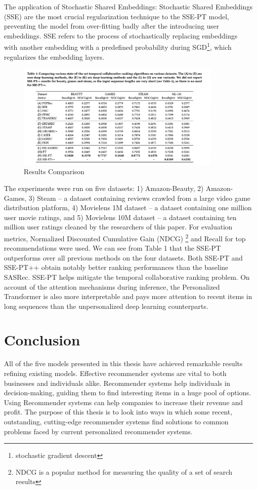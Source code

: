 The application of Stochastic Shared Embeddings: Stochastic Shared Embeddings (SSE) are the most crucial regularization technique to the SSE-PT model, preventing the model from over-fitting badly after the introducing user embeddings. SSE refers to the process of 
stochastically replacing embeddings with another embedding with
a predefined probability during SGD\footnote{stochastic gradient descent}, which regularizes the embedding layers. 
\begin{figure}[ht!]
    \centering
    \includegraphics[width=100mm]{results_Transformer.png}
    \caption{Results Comparison
    \label{overflow}}
\end{figure}
The experiments were run on five datasets: 1) Amazon-Beauty, 2) Amazon-Games, 3) Steam -- a dataset containing reviews crawled from a large video game distribution platform, 4) Movielens 1M dataset -- a dataset containing one million user movie ratings, and 5) Movielens 10M dataset -- a dataset containing ten million user ratings cleaned by the researchers of this paper. For evaluation metrics, Normalized Discounted Cumulative Gain (NDCG) \footnote{NDCG is a popular method for measuring the quality of a set of search results} and Recall for top recommendations were used. We can see from Table 1 that the SSE-PT outperforms over all previous methods on the four datasets. Both SSE-PT and SSE-PT++ obtain notably better ranking performances than the baseline SASRec. SSE-PT helps mitigate the temporal collaborative ranking problem. On account of the attention mechanisms
during inference, the Personalized Transformer is also more interpretable and pays more attention to recent items in long sequences than the unpersonalized deep learning counterparts.

\chapter{ Conclusion}

All of the five models presented in this thesis have achieved remarkable results refining existing models. Effective recommender systems are vital to both businesses and individuals alike. Recommender systems help individuals in decision-making, guiding them to find interesting items in a huge pool of options. Using Recommender systems can help companies to increase their revenue and profit. The purpose of this thesis is to look into ways in which some recent, outstanding, cutting-edge recommender systems find solutions to common problems faced by current personalized recommender systems.

